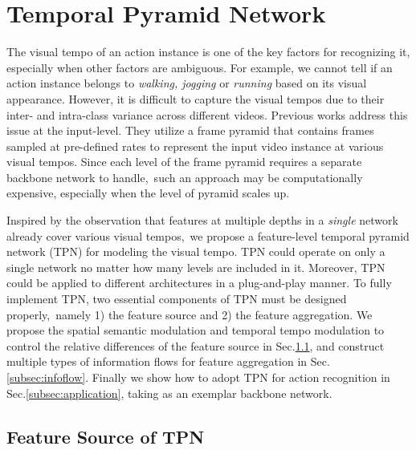 \documentclass[10pt,twocolumn,letterpaper]{article}
\begin{document}
\section{Temporal Pyramid Network}
\label{sec:method}

The visual tempo of an action instance is one of the key factors for recognizing it, especially when other factors are ambiguous. 
For example, we cannot tell if an action instance belongs to \emph{walking, jogging} or \emph{running} based on its visual appearance.
However, 
it is difficult to capture the visual tempos due to their inter- and intra-class variance across different videos. 
Previous works \cite{slowfast,dtpn,spn} address this issue at the input-level.
They utilize a frame pyramid that contains frames sampled at pre-defined rates to represent the input video instance at various visual tempos.
Since each level of the frame pyramid requires a separate backbone network to handle,\
such an approach may be computationally expensive, especially when the level of pyramid scales up.

Inspired by the observation that features at multiple depths in a \emph{single} network already cover various visual tempos,\
we propose a feature-level temporal pyramid network (TPN) for modeling the visual tempo.
TPN could operate on only a single network no matter how many levels are included in it.
Moreover, TPN could be applied to different architectures in a plug-and-play manner.
To fully implement TPN, two essential components of TPN must be designed properly,\
namely 1) the feature source and 2) the feature aggregation.
We propose the spatial semantic modulation and temporal tempo modulation to control the relative differences of the feature source in Sec.\ref{subsec:sources}, 
and construct multiple types of information flows for feature aggregation in Sec.\ref{subsec:infoflow}.
Finally we show how to adopt TPN for action recognition in Sec.\ref{subsec:application},
taking \cite{slowfast} as an exemplar backbone network.

\subsection{Feature Source of TPN}\label{subsec:sources}
\end{document}
